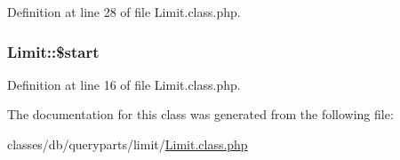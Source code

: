 Definition at line 28 of file Limit.\-class.\-php.

\hypertarget{classLimit_a58e5f9abf39a412a992c922b3342d093}{
\subsubsection[{\$start}]{\setlength{\rightskip}{0pt plus 5cm}Limit\-::\$start}}\label{classLimit_a58e5f9abf39a412a992c922b3342d093}


Definition at line 16 of file Limit.\-class.\-php.



The documentation for this class was generated from the following file\-:\begin{DoxyCompactItemize}
\item 
classes/db/queryparts/limit/\hyperlink{Limit_8class_8php}{Limit.\-class.\-php}\end{DoxyCompactItemize}
